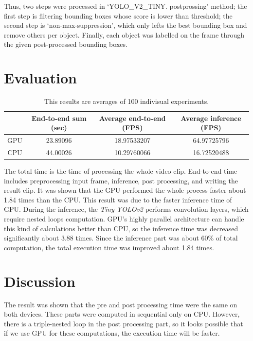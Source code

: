 \documentclass[a4paper,12pt]{article}
\begin{document}
Thus, two steps were processed in ‘YOLO\_V2\_TINY.
postprossing’ method; the first step is filtering bounding boxes whose score is lower than threshold; the second step is ‘non-max-suppression’, which only lefts the best bounding box and remove others per object.
Finally, each object was labelled on the frame through the given post-processed bounding boxes. 

\section{Evaluation}
\begin{table}[h!]
	\centering
	\begin{tabular}{@{}cccc@{}}
		\toprule
		\multicolumn{1}{l}{} & \multicolumn{1}{c}{End-to-end sum (sec)} & \multicolumn{1}{c}{Average end-to-end (FPS)} & \multicolumn{1}{c}{Average inference (FPS)} \\ \midrule
		GPU & 23.89096 & 18.97533207 & 64.97725796 \\ 
		CPU & 44.00026 & 10.29760066 & 16.72520488 \\ \bottomrule
	\end{tabular}
	\caption{This results are averages of 100 indivisual experiments.}
	\label{tab:eval}
\end{table}
The total time is the time of processing the whole video clip. End-to-end time includes preprocessing input frame, inference, post processing, and writing the result clip.
It was shown that the GPU performed the whole process faster about 1.84 times  than the CPU\@.
 This result was due to the faster inference time of GPU\@. During the inference, the \emph{Tiny YOLOv2} performs convolution layers, which require nested loops computation.
GPU’s highly parallel architecture can handle this kind of calculations better than CPU, so the inference time was decreased significantly about 3.88 times. 
Since the inference part was about 60\% of total computation, the total execution time was improved about 1.84 times.

\section{Discussion}
The result was shown that the pre and post processing time were the same on both devices. These parts were computed in sequential only on CPU\@. 
However, there is a triple-nested loop in the post processing part, so it looks possible that if we use GPU for these computations, the execution time will be faster.
\end{document}
